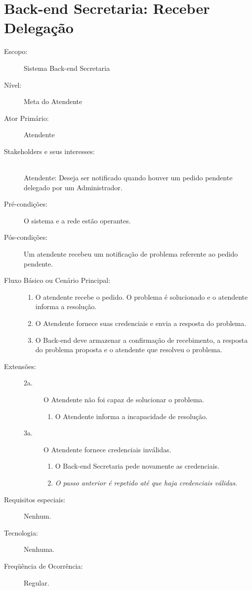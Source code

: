 \documentclass[brazil,times]{abnt}
\begin{document}
\section{Back-end Secretaria: Receber Delegação \label{caso-receber-delegacao}}
\begin{description}
\item[Escopo:] Sistema Back-end Secretaria
\item[Nível:] Meta do Atendente
\item[Ator Primário:] Atendente
\item[Stakeholders e seus interesses:] \hfill \\
Atendente: Deseja ser notificado quando houver um pedido pendente delegado por
um Administrador.

\item[Pré-condições:] O sistema e a rede estão operantes.
\item[Pós-condições:] Um atendente recebeu um notificação de problema referente
ao pedido pendente.
\item[Fluxo Básico ou Cenário Principal:]\hfill
\begin{enumerate}
  \item O atendente recebe o pedido. O problema é solucionado e o atendente
  informa a resolução.
  \item O Atendente fornece suas credenciais e envia a resposta do problema.
  \item O Back-end deve armazenar a confirmação de recebimento, a resposta
  do problema proposta e o atendente que resolveu o problema.
\end{enumerate}

\item[Extensões:]\hfill
\begin{description}
	\item[2a.] O Atendente não foi capaz de solucionar o problema.
	\begin{enumerate}
 		\item O Atendente informa a incapacidade de resolução.
	\end{enumerate} 
	
	\item[3a.] O Atendente fornece credenciais inválidas. 
	\begin{enumerate}
 		\item O Back-end Secretaria pede novamente as credenciais.
 		\item \emph{O passo anterior é repetido até que haja credenciais válidas.}
	\end{enumerate} 
\end{description}
\item[Requisitos especiais:] Nenhum.
\item[Tecnologia:] Nenhuma.
\item[Freqüência de Ocorrência:] Regular.

\end{description}
\end{document}
